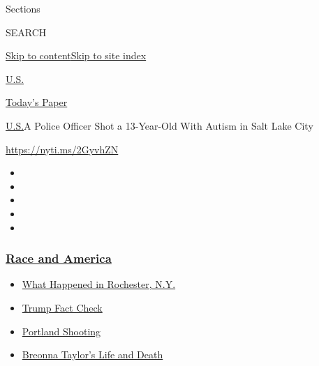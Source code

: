 Sections

SEARCH

\protect\hyperlink{site-content}{Skip to
content}\protect\hyperlink{site-index}{Skip to site index}

\href{https://www.nytimes3xbfgragh.onion/section/us}{U.S.}

\href{https://myaccount.nytimes3xbfgragh.onion/auth/login?response_type=cookie\&client_id=vi}{}

\href{https://www.nytimes3xbfgragh.onion/section/todayspaper}{Today's
Paper}

\href{/section/us}{U.S.}\textbar{}A Police Officer Shot a 13-Year-Old
With Autism in Salt Lake City

\url{https://nyti.ms/2GyvhZN}

\begin{itemize}
\item
\item
\item
\item
\item
\end{itemize}

\hypertarget{race-and-america}{%
\subsubsection{\texorpdfstring{\href{https://www.nytimes3xbfgragh.onion/news-event/george-floyd-protests-minneapolis-new-york-los-angeles?name=styln-george-floyd\&region=TOP_BANNER\&block=storyline_menu_recirc\&action=click\&pgtype=Article\&impression_id=ac5c10d0-f27d-11ea-84fb-6965c80d8485\&variant=undefined}{Race
and America}}{Race and America}}\label{race-and-america}}

\begin{itemize}
\tightlist
\item
  \href{https://www.nytimes3xbfgragh.onion/2020/09/04/nyregion/rochester-police-daniel-prude.html?name=styln-george-floyd\&region=TOP_BANNER\&block=storyline_menu_recirc\&action=click\&pgtype=Article\&impression_id=ac5c37e0-f27d-11ea-84fb-6965c80d8485\&variant=undefined}{What
  Happened in Rochester, N.Y.}
\item
  \href{https://www.nytimes3xbfgragh.onion/2020/09/01/us/politics/trump-fact-check-protests.html?name=styln-george-floyd\&region=TOP_BANNER\&block=storyline_menu_recirc\&action=click\&pgtype=Article\&impression_id=ac5c37e1-f27d-11ea-84fb-6965c80d8485\&variant=undefined}{Trump
  Fact Check}
\item
  \href{https://www.nytimes3xbfgragh.onion/2020/08/30/us/portland-shooting-explained.html?name=styln-george-floyd\&region=TOP_BANNER\&block=storyline_menu_recirc\&action=click\&pgtype=Article\&impression_id=ac5c37e2-f27d-11ea-84fb-6965c80d8485\&variant=undefined}{Portland
  Shooting}
\item
  \href{https://www.nytimes3xbfgragh.onion/2020/08/30/us/breonna-taylor-police-killing.html?name=styln-george-floyd\&region=TOP_BANNER\&block=storyline_menu_recirc\&action=click\&pgtype=Article\&impression_id=ac5c37e3-f27d-11ea-84fb-6965c80d8485\&variant=undefined}{Breonna
  Taylor's Life and Death}
\end{itemize}

